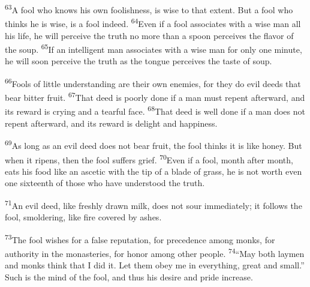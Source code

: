 \documentclass[openany,12pt,english]{book}
\newenvironment{para}{\par\pretolerance=100\tolerance=200\setlength{\emergencystretch}{0.6em}\relax}{\par}
\begin{document}
\begin{para}
    \textsuperscript{63}\thinspace{}A fool who knows his own fool\-ish\-ness, is wise to that ex\-tent. But a fool who thinks he is wise, is a fool in\-deed.
    \textsuperscript{64}\thinspace{}E\-ven if a fool associates with a wise man all his life, he will per\-ceive the truth no more than a spoon perceives the fla\-vor of the soup.
    \textsuperscript{65}\thinspace{}If an in\-tel\-li\-gent man associates with a wise man for on\-ly one min\-ute, he will soon per\-ceive the truth as the tongue perceives the taste of soup.
\end{para}

\begin{para}
    \textsuperscript{66}\thinspace{}Fools of lit\-tle un\-der\-stand\-ing are their own enemies, for they do evil deeds that bear bit\-ter fruit.
    \textsuperscript{67}\thinspace{}That deed is poor\-ly done if a man must re\-pent af\-ter\-ward, and its re\-ward is cry\-ing and a tear\-ful face.
    \textsuperscript{68}\thinspace{}That deed is well done if a man does not re\-pent af\-ter\-ward, and its re\-ward is de\-light and hap\-pi\-ness.
\end{para}

\begin{para}
    \textsuperscript{69}\thinspace{}As long as an evil deed does not bear fruit, the fool thinks it is like hon\-ey. But when it ripens, then the fool suffers grief.
    \textsuperscript{70}\thinspace{}E\-ven if a fool, month af\-ter month, eats his food like an as\-cet\-ic with the tip of a blade of grass, he is not worth e\-ven one six\-teenth of those who have un\-der\-stood the truth.
\end{para}

\begin{para}
    \textsuperscript{71}\thinspace{}An evil deed, like fresh\-ly drawn milk, does not sour im\-me\-di\-ate\-ly; it follows the fool, smoldering, like fire cov\-ered by ash\-es.
\end{para}

\begin{para}
    \textsuperscript{73}\thinspace{}The fool wishes for a false rep\-u\-ta\-tion, for prec\-e\-dence a\-mong monks, for au\-thor\-i\-ty in the monasteries, for hon\-or a\-mong oth\-er peo\-ple.
    \textsuperscript{74}\thinspace{}“May both laymen and monks think that I did it. Let them o\-bey me in eve\-ry\-thing, great and small.” Such is the mind of the fool, and thus his de\-sire and pride in\-crease.
\end{para}
\end{document}
